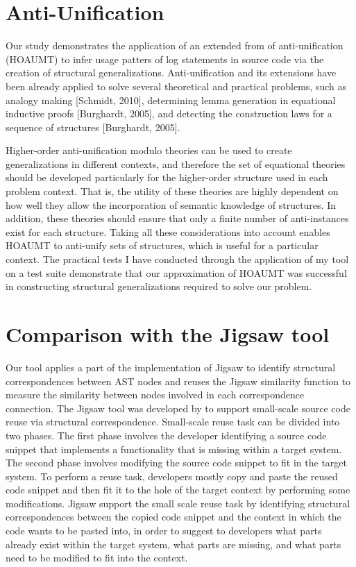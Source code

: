 \section{Anti-Unification}  \label{auTheory}
Our study demonstrates the application of an extended from of anti-unification (HOAUMT) to infer usage patters of log statements in source code via the creation of structural generalizations. Anti-unification and its extensions have been already applied to solve several theoretical and practical problems, such as analogy making [Schmidt, 2010], determining lemma generation in equational inductive proofs [Burghardt, 2005], and detecting the construction laws for a sequence of structures [Burghardt, 2005]. 

Higher-order anti-unification modulo theories can be used to create generalizations in different contexts, and therefore the set of equational theories should be developed particularly for the higher-order structure used in each problem context. That is, the utility of these theories are highly dependent on how well they allow the incorporation of semantic knowledge of structures. In addition, these theories should ensure that only a finite number of anti-instances exist for each structure. Taking all these considerations into account enables HOAUMT to anti-unify sets of structures, which is useful for a particular context. The practical tests I have conducted through the application of my tool on a test suite demonstrate that our approximation of HOAUMT was successful in constructing structural generalizations required to solve our problem.
%

\section{Comparison with the Jigsaw tool}  \label{comparison-Jigsaw}
 
Our tool applies a part of the implementation of Jigsaw to identify structural correspondences between AST nodes and reuses the Jigsaw similarity function to measure the similarity between nodes involved in each correspondence connection. 
The Jigsaw tool was developed by \citet{2008:fse:cottrell} to support small-scale source code reuse via structural correspondence. Small-scale reuse task can be divided into two phases. The first phase involves the developer identifying a source code snippet that implements a functionality that is missing within a target system. The second phase involves modifying the source code snippet to fit in the target system. To perform a reuse task, developers mostly copy and paste the reused code snippet and then fit it to the hole of the target context by performing some modifications. Jigsaw support the small scale reuse task by identifying structural correspondences between the copied code snippet and the context in which the code wants to be pasted into, in order to suggest to  developers what parts already exist within the target system, what parts are missing, and what parts need to be modified to fit into the context. 

